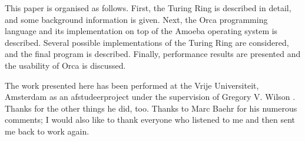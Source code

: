 This paper is organised as follows. First, the Turing Ring is described
in detail, and some background information is given. Next, the Orca
programming language and its implementation on top of the 
Amoeba operating system is described. Several possible
implementations of the Turing
Ring are considered, and the final program is described. Finally,
performance results are presented and the usability of Orca is
discussed.

The work presented here has been performed at the Vrije Universiteit,
Amsterdam as an afstudeerproject under the supervision of Gregory V.
Wilson \nocite{Cowichan}. Thanks for the other things he did, too.
Thanks to Marc Baehr for his numerous comments;
I would also like to thank everyone who listened to me and then sent me back to
work again.
